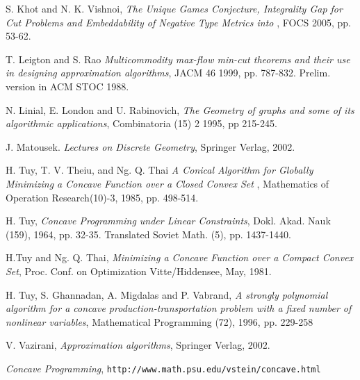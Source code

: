 \documentclass [11pt,a4paper]{article}
\begin{document}
\begin{thebibliography}{99}
 S. Khot and N. K. Vishnoi, {\it The Unique Games Conjecture, Integrality Gap for Cut Problems and Embeddability of Negative Type Metrics into  }, {\sf FOCS} 2005, pp. 53-62.

T. Leigton and S. Rao
{\it Multicommodity max-flow min-cut theorems and their use in designing approximation
algorithms}, {\sf JACM} 46 1999, pp. 787-832. Prelim. version in ACM STOC 1988.

 N. Linial, E. London and U. Rabinovich, {\it The Geometry of graphs and some of its algorithmic applications},
{\sf Combinatoria} (15) 2 1995, pp 215-245.

 J. Matousek. {\it Lectures on Discrete Geometry}, {\sf Springer Verlag}, 2002.

 H. Tuy, T. V. Theiu, and Ng. Q. Thai {\it A Conical Algorithm for Globally Minimizing a Concave Function over a Closed Convex Set }, 
{\sf Mathematics of Operation Research}(10)-3, 1985, pp. 498-514.


 H. Tuy, {\it Concave Programming under Linear Constraints}, {\sf Dokl. Akad. Nauk} (159), 1964, pp. 32-35. Translated {\sf Soviet Math.} (5), pp. 1437-1440.

 H.Tuy and Ng. Q. Thai,{ \it Minimizing a Concave Function over a Compact Convex Set}, {\sf Proc. Conf. on Optimization Vitte/Hiddensee}, May, 1981.

 H. Tuy, S. Ghannadan, A. Migdalas and P. Vabrand, {\it A strongly polynomial algorithm for a concave production-transportation problem with a fixed number of nonlinear variables}, {\sf Mathematical Programming} (72), 1996, pp. 229-258


 V. Vazirani, {\it Approximation algorithms}, {\sf Springer Verlag}, 2002.

 {\it Concave Programming}, {\tt http://www.math.psu.edu/vstein/concave.html}

\end{thebibliography}
\end{document}
